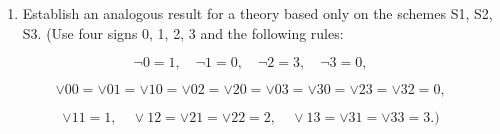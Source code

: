\begin{enumerate}
\def\labelenumi{(\alph{enumi})}
\setcounter{enumi}{3}
\tightlist
\item
  Establish an analogous result for a theory based only on the schemes S1, S2, S3. (Use four signs 0, 1, 2, 3 and the following rules:
\end{enumerate}

\[
\lnot 0 = 1, \quad \lnot 1 = 0, \quad \lnot 2 = 3, \quad \lnot 3 = 0,
\]

\[
\vee 0 0 = \vee 0 1 = \vee 1 0 = \vee 0 2 = \vee 2 0 = \vee 0 3 = \vee 3 0 = \vee 2 3 = \vee 3 2 = 0,
\]

\[
\vee 1 1 = 1, \quad \vee 1 2 = \vee 2 1 = \vee 2 2 = 2, \quad \vee 1 3 = \vee 3 1 = \vee 3 3 = 3.)
\]
